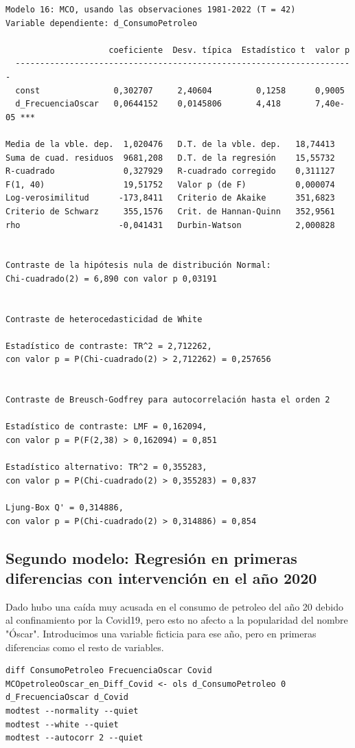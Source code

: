 \documentclass[10pt]{article}
\begin{document}
\begin{verbatim}
Modelo 16: MCO, usando las observaciones 1981-2022 (T = 42)
Variable dependiente: d_ConsumoPetroleo

                     coeficiente  Desv. típica  Estadístico t  valor p 
  ---------------------------------------------------------------------
  const               0,302707     2,40604         0,1258      0,9005  
  d_FrecuenciaOscar   0,0644152    0,0145806       4,418       7,40e-05 ***

Media de la vble. dep.  1,020476   D.T. de la vble. dep.   18,74413
Suma de cuad. residuos  9681,208   D.T. de la regresión    15,55732
R-cuadrado              0,327929   R-cuadrado corregido    0,311127
F(1, 40)                19,51752   Valor p (de F)          0,000074
Log-verosimilitud      -173,8411   Criterio de Akaike      351,6823
Criterio de Schwarz     355,1576   Crit. de Hannan-Quinn   352,9561
rho                    -0,041431   Durbin-Watson           2,000828


Contraste de la hipótesis nula de distribución Normal:
Chi-cuadrado(2) = 6,890 con valor p 0,03191


Contraste de heterocedasticidad de White

Estadístico de contraste: TR^2 = 2,712262,
con valor p = P(Chi-cuadrado(2) > 2,712262) = 0,257656


Contraste de Breusch-Godfrey para autocorrelación hasta el orden 2

Estadístico de contraste: LMF = 0,162094,
con valor p = P(F(2,38) > 0,162094) = 0,851

Estadístico alternativo: TR^2 = 0,355283,
con valor p = P(Chi-cuadrado(2) > 0,355283) = 0,837

Ljung-Box Q' = 0,314886,
con valor p = P(Chi-cuadrado(2) > 0,314886) = 0,854
\end{verbatim}
\subsection*{Segundo modelo: Regresión en primeras diferencias con intervención en el año 2020}
\label{sec:org6e7a65e}
Dado hubo una caída muy acusada en el consumo de petroleo del año 20
debido al confinamiento por la Covid19, pero esto no afecto a la
popularidad del nombre "Óscar". Introducimos una variable ficticia
para ese año, pero en primeras diferencias como el resto de variables.

\begin{verbatim}
diff ConsumoPetroleo FrecuenciaOscar Covid
MCOpetroleoOscar_en_Diff_Covid <- ols d_ConsumoPetroleo 0 d_FrecuenciaOscar d_Covid
modtest --normality --quiet
modtest --white --quiet
modtest --autocorr 2 --quiet
\end{verbatim}
\end{document}

